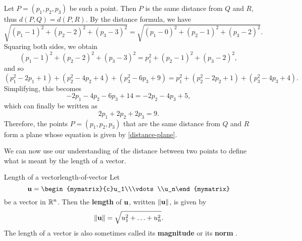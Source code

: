 \begin{solution}
  Let $P = (p_1,p_2,p_3)$ be such a point. Then $P$ is the same
  distance from $Q$ and $R$, thus $d(P,Q)=d(P,R)$. By the distance
  formula, we have
  \begin{equation*}
    \sqrt{(p_1-1)^{2}+(p_2-2)^{2}+(p_3-3)^{2}}=
    \sqrt{(p_1-0)^{2}+(p_2-1)^{2}+(p_3-2)^{2}}.
  \end{equation*}
  Squaring both sides, we obtain
  \begin{equation*}
    (p_1 -1) ^{2}+(p_2 -2) ^{2}+(p_3 -3)
    ^{2}=p_1^{2}+(p_2-1) ^{2}+(p_3 -2) ^{2},
  \end{equation*}
  and so
  \begin{equation*}
    \allowbreak (p_1^{2}-2p_1+1)+(p_2^{2}-4p_2+4)+(p_3^{2}-6p_3+9)=p_1^{2}+(p_2^{2}-2p_2+1)+(p_3^{2}-4p_3+4).
  \end{equation*}
  Simplifying, this becomes
  \begin{equation*}
    -2p_1-4p_2-6p_3+14=-2p_2-4p_3+5,
  \end{equation*}
  which can finally be written as
  \begin{equation}\label{distance-plane}
    2p_1+2p_2+2p_3=9.
  \end{equation}
  Therefore, the points $P = (p_1,p_2,p_3)$ that are the same
  distance from $Q$ and $R$ form a plane whose equation is given by
  \eqref{distance-plane}.
\end{solution}

We can now use our understanding of the distance between two points to
define what is meant by the length of a vector.

\begin{definition}{Length of a vector}{length-of-vector}
  Let
  \begin{equation*}
    \vect{u} = \begin{mymatrix}{c}u_1\\\vdots\\u_n\end{mymatrix}
  \end{equation*}
  be a vector in $\mathbb{R}^n$. Then the
  \textbf{length} of
  $\mbox{\bf u}$, written $\left\|\mbox{\bf u}\right\|$, is given by
  \begin{equation*}
    \left\|\mbox{\bf u}\right\| = \sqrt{u_{1}^2 + \ldots + u_{n}^2}.
  \end{equation*}
  The length of a vector is also sometimes called its
  \textbf{magnitude}%
   or its
  \textbf{norm}%
  .
\end{definition}

